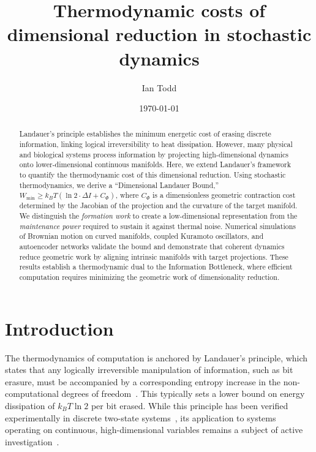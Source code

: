 \documentclass[aps,pre,twocolumn,superscriptaddress,floatfix]{revtex4-2}
\begin{document}
\title{Thermodynamic costs of dimensional reduction in stochastic dynamics}

\author{Ian Todd}

\date{\today}

\begin{abstract}
Landauer's principle establishes the minimum energetic cost of erasing discrete information, linking logical irreversibility to heat dissipation. However, many physical and biological systems process information by projecting high-dimensional dynamics onto lower-dimensional continuous manifolds. Here, we extend Landauer's framework to quantify the thermodynamic cost of this dimensional reduction. Using stochastic thermodynamics, we derive a ``Dimensional Landauer Bound,'' $W_{\text{min}} \ge k_B T (\ln 2 \cdot \Delta I + C_\Phi)$, where $C_\Phi$ is a dimensionless geometric contraction cost determined by the Jacobian of the projection and the curvature of the target manifold. We distinguish the \textit{formation work} to create a low-dimensional representation from the \textit{maintenance power} required to sustain it against thermal noise. Numerical simulations of Brownian motion on curved manifolds, coupled Kuramoto oscillators, and autoencoder networks validate the bound and demonstrate that coherent dynamics reduce geometric work by aligning intrinsic manifolds with target projections. These results establish a thermodynamic dual to the Information Bottleneck, where efficient computation requires minimizing the geometric work of dimensionality reduction.
\end{abstract}

\maketitle

\section{Introduction}

The thermodynamics of computation is anchored by Landauer's principle, which states that any logically irreversible manipulation of information, such as bit erasure, must be accompanied by a corresponding entropy increase in the non-computational degrees of freedom~\cite{landauer1961,bennett1982}. This typically sets a lower bound on energy dissipation of $k_B T \ln 2$ per bit erased. While this principle has been verified experimentally in discrete two-state systems~\cite{berut2012}, its application to systems operating on continuous, high-dimensional variables remains a subject of active investigation~\cite{parrondo2015,seifert2012}.
\end{document}

